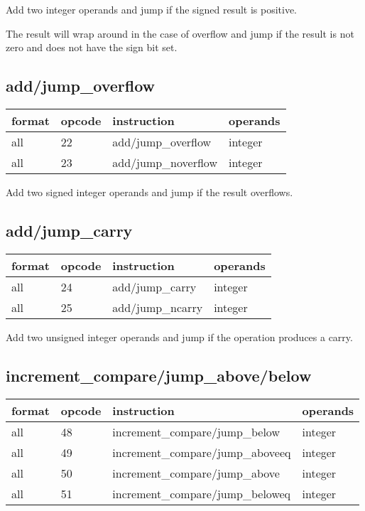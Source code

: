 \documentclass[forwardcom.tex]{subfiles}
\begin{document}
Add two integer operands and jump if the signed result is positive.

The result will wrap around in the case of overflow and jump if the result is not zero and does not have the sign bit set.


\subsection{add/jump\_overflow}
\label{table:addJumpOverflInstruction}
\begin{tabular}{|p{16mm}|p{12mm}|p{60mm}|p{50mm}|}
\hline
\bfseries format & \bfseries opcode & \bfseries instruction & \bfseries operands \\ \hline
all & 22 & add/jump\_overflow & integer \\ \hline
all & 23 & add/jump\_noverflow & integer\\ \hline
\end{tabular}
\vv

Add two signed integer operands and jump if the result overflows.
\vv


\subsection{add/jump\_carry}
\label{table:addJumpCarryInstruction}
\begin{tabular}{|p{16mm}|p{12mm}|p{60mm}|p{50mm}|}
\hline
\bfseries format & \bfseries opcode & \bfseries instruction & \bfseries operands \\ \hline
all & 24 & add/jump\_carry & integer \\ \hline
all & 25 & add/jump\_ncarry & integer\\ \hline
\end{tabular}
\vv

Add two unsigned integer operands and jump if the operation produces a carry.
\vv


\subsection{increment\_compare/jump\_above/below}
\label{table:incrementCompareJumpInstructions}
\begin{tabular}{|p{16mm}|p{12mm}|p{60mm}|p{50mm}|}
\hline
\bfseries format & \bfseries opcode & \bfseries instruction & \bfseries operands \\ \hline
all & 48 & increment\_compare/jump\_below & integer \\ \hline
all & 49 & increment\_compare/jump\_aboveeq & integer \\ \hline
all & 50 & increment\_compare/jump\_above & integer \\ \hline
all & 51 & increment\_compare/jump\_beloweq & integer \\ \hline
\end{tabular}
\vv
\end{document}
